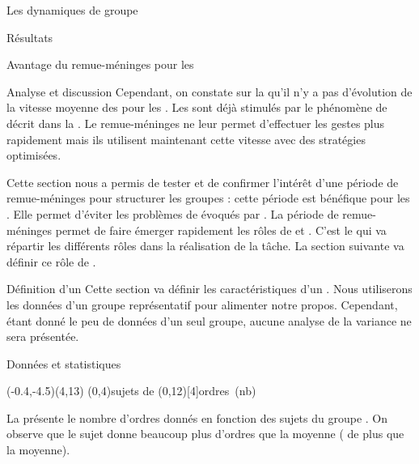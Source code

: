 \documentclass[myfrancais]{mythesis}
\begin{document}
\begin{mychapter}{Les dynamiques de groupe}
\begin{mysection}{Résultats}
\begin{mysubsection}{Avantage du remue-méninges pour les }
\begin{mysubsubsection}{Analyse et discussion}
					Cependant, on constate sur la  qu'il n'y a pas d'évolution de la vitesse moyenne des  pour les .
					Les  sont déjà stimulés par le phénomène de  décrit dans la .
					Le remue-méninges ne leur permet d'effectuer les gestes plus rapidement mais ils utilisent maintenant cette vitesse avec des stratégies optimisées.

					Cette section nous a permis de tester et de confirmer l'intérêt d'une période de remue-méninges pour structurer les groupes : cette période est bénéfique pour les .
					Elle permet d'éviter les problèmes de  évoqués par .
					La période de remue-méninges permet de faire émerger rapidement les rôles de  et .
					C'est le  qui va répartir les différents rôles dans la réalisation de la tâche.
					La section suivante va définir ce rôle de .
				\end{mysubsubsection}
			\end{mysubsection}
			\begin{mysubsection}{Définition d'un }
				Cette section va définir les caractéristiques d'un .
				Nous utiliserons les données d'un groupe représentatif pour alimenter notre propos.
				Cependant, étant donné le peu de données d'un seul groupe, aucune analyse de la variance ne sera présentée.
				\begin{mysubsubsection}{Données et statistiques}
					\begin{myfigure}
						\begin{myps}(-0.4,-4.5)(4,13)
							\myaxes(0,4){sujets de }(0,12)[4]{ordres~(nb)}
						\end{myps}
					\end{myfigure}

					La  présente le nombre d'ordres donnés  en fonction des sujets du groupe .
					On observe que le sujet  donne beaucoup plus d'ordres que la moyenne ( de plus que la moyenne).


\end{mysubsubsection}
\end{mysubsection}
\end{mysection}
\end{mychapter}
\end{document}
